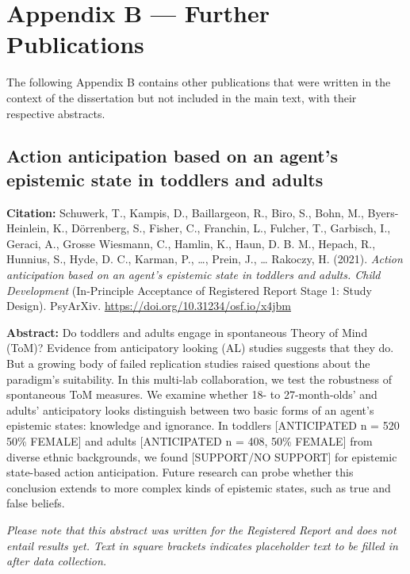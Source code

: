 \documentclass[
]{scrbook}
\begin{document}
\chapter{Appendix B --- Further Publications}\label{appendixB}

The following Appendix B contains other publications that were written in the context of the dissertation but not included in the main text, with their respective abstracts.

\section{Action anticipation based on an agent's epistemic state in toddlers and adults}\label{action-anticipation-based-on-an-agents-epistemic-state-in-toddlers-and-adults}

\textbf{Citation:} Schuwerk, T., Kampis, D., Baillargeon, R., Biro, S., Bohn, M., Byers-Heinlein, K., Dörrenberg, S., Fisher, C., Franchin, L., Fulcher, T., Garbisch, I., Geraci, A., Grosse Wiesmann, C., Hamlin, K., Haun, D. B. M., Hepach, R., Hunnius, S., Hyde, D. C., Karman, P., \ldots, Prein, J., \ldots{} Rakoczy, H. (2021). \emph{Action anticipation based on an agent's epistemic state in toddlers and adults. Child Development} (In-Principle Acceptance of Registered Report Stage 1: Study Design). PsyArXiv. \url{https://doi.org/10.31234/osf.io/x4jbm}

\textbf{Abstract:} Do toddlers and adults engage in spontaneous Theory of Mind (ToM)? Evidence from anticipatory looking (AL) studies suggests that they do. But a growing body of failed replication studies raised questions about the paradigm's suitability. In this multi-lab collaboration, we test the robustness of spontaneous ToM measures. We examine whether 18- to 27-month-olds' and adults' anticipatory looks distinguish between two basic forms of an agent's epistemic states: knowledge and ignorance. In toddlers {[}ANTICIPATED n = 520 50\% FEMALE{]} and adults {[}ANTICIPATED n = 408, 50\% FEMALE{]} from diverse ethnic backgrounds, we found {[}SUPPORT/NO SUPPORT{]} for epistemic state-based action anticipation. Future research can probe whether this conclusion extends to more complex kinds of epistemic states, such as true and false beliefs.

\emph{Please note that this abstract was written for the Registered Report and does not entail results yet. Text in square brackets indicates placeholder text to be filled in after data collection.}

\newpage
\end{document}
